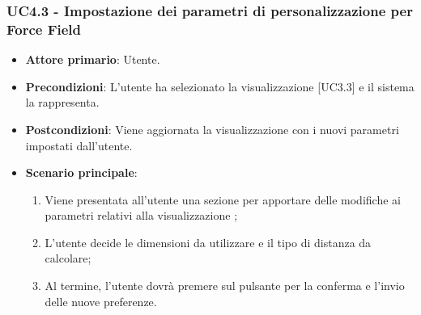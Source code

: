 \subsubsection{UC4.3 - Impostazione dei parametri di personalizzazione per Force Field}
\begin{itemize}
	\item \textbf{Attore primario}: Utente.
	\item \textbf{Precondizioni}: L'utente ha selezionato la visualizzazione  [UC3.3] e il sistema la rappresenta.
	\item \textbf{Postcondizioni}: Viene aggiornata la visualizzazione  con i nuovi parametri impostati dall'utente.
	\item \textbf{Scenario principale}:
	\begin{enumerate}
			\item Viene presentata all'utente una sezione per apportare delle modifiche ai parametri relativi alla visualizzazione ;
			\item L'utente decide le dimensioni da utilizzare e il tipo di distanza da calcolare;
			\item Al termine, l'utente dovrà premere sul pulsante per la conferma e l'invio delle nuove preferenze.
		\end{enumerate}
\end{itemize}